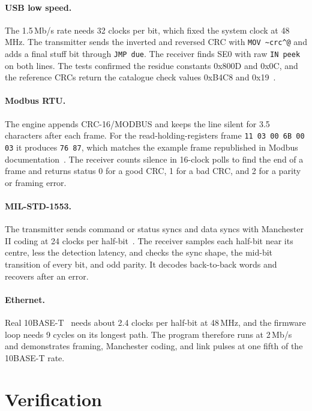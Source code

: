 \documentclass[11pt]{article}
\begin{document}
\paragraph{USB low speed.}
The 1.5\,Mb/s rate needs 32 clocks per bit, which fixed the system clock at 48\,MHz.
The transmitter sends the inverted and reversed CRC with \texttt{MOV \textasciitilde crc\^{}@} and adds a final stuff bit through \texttt{JMP due}.
The receiver finds SE0 with raw \texttt{IN peek} on both lines.
The tests confirmed the residue constants 0x800D and 0x0C, and the reference CRCs return the catalogue check values 0xB4C8 and 0x19~\cite{reveng}.

\paragraph{Modbus RTU.}
The engine appends CRC-16/MODBUS and keeps the line silent for 3.5 characters after each frame.
For the read-holding-registers frame \texttt{11 03 00 6B 00 03} it produces \texttt{76 87}, which matches the example frame republished in Modbus documentation~\cite{modbus2}.
The receiver counts silence in 16-clock polls to find the end of a frame and returns status 0 for a good CRC, 1 for a bad CRC, and 2 for a parity or framing error.

\paragraph{MIL-STD-1553.}
The transmitter sends command or status syncs and data syncs with Manchester II coding at 24 clocks per half-bit~\cite{mil1553}.
The receiver samples each half-bit near its centre, less the detection latency, and checks the sync shape, the mid-bit transition of every bit, and odd parity.
It decodes back-to-back words and recovers after an error.

\paragraph{Ethernet.}
Real 10BASE-T~\cite{mdio} needs about 2.4 clocks per half-bit at 48\,MHz, and the firmware loop needs 9 cycles on its longest path.
The program therefore runs at 2\,Mb/s and demonstrates framing, Manchester coding, and link pulses at one fifth of the 10BASE-T rate.

\section{Verification}
\end{document}
